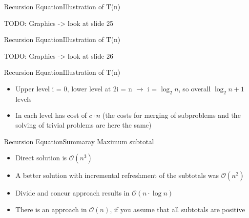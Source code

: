 
\begin{frame}{Recursion Equation}{Illustration of T(n)}

TODO: Graphics -> look at slide 25 \vspace{2em}

\end{frame}


\begin{frame}{Recursion Equation}{Illustration of T(n)}

TODO: Graphics -> look at slide 26 \vspace{2em}

\end{frame}


\begin{frame}{Recursion Equation}{Illustration of T(n)}
	\begin{itemize}
		\item
			Upper level i = 0, lower level at 2i = n $\rightarrow$ i = $\log_2 n$, so 
			overall $\log_2 n + 1$ levels
		\item
			In each level has cost of $c \cdot n$ (the costs for merging of 
			subproblems and the solving of trivial problems are here the same)
	\end{itemize}
\end{frame}


\begin{frame}{Recursion Equation}{Summaray Maximum subtotal}
	\begin{itemize}
		\item
			Direct solution is $\mathcal{O}(n^3)$
		\item
			A better solution with incremental refreshment of the subtotals was 
			$\mathcal{O}(n^2)$
		\item
			Divide and concur approach results in $\mathcal{O}(n \cdot \log n)$
		\item
			There is an approach in $\mathcal{O}(n)$, if you assume that all 
			subtotals are positive
	\end{itemize}
\end{frame}